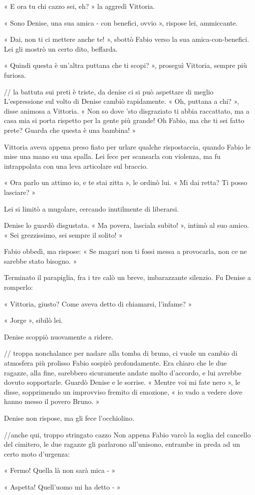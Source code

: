 « E ora tu chi cazzo sei, eh? » la aggredì Vittoria.

« Sono Denise, una sua amica - con benefici, ovvio », rispose lei, ammiccante.

« Dai, non ti ci mettere anche te! », sbottò Fabio verso la sua amica-con-benefici. Lei gli mostrò un certo dito, beffarda.

« Quindi questa è un'altra puttana che ti scopi? », proseguì Vittoria, sempre più furiosa.

// la battuta sui preti è triste, da denise ci si può aspettare di meglio
L'espressione sul volto di Denise cambiò rapidamente. « Oh, puttana a chi? », disse animosa a Vittoria. « Non so dove 'sto disgraziato ti abbia raccattato, ma a casa mia si porta rispetto per la gente più grande! Oh Fabio, ma che ti sei fatto prete? Guarda che questa è una bambina! »

Vittoria aveva appena preso fiato per urlare qualche rispostaccia, quando Fabio le mise una mano su una spalla. Lei fece per scansarla con violenza, ma fu intrappolata con una leva articolare sul braccio.

« Ora parlo un attimo io, e te stai zitta », le ordinò lui. « Mi dai retta? Ti posso lasciare? »

Lei si limitò a mugolare, cercando inutilmente di liberarsi.

Denise lo guardò disgustata. « Ma povera, lasciala subito! », intimò al suo amico. « Sei grezzissimo, sei sempre il solito! »

Fabio obbedì, ma rispose: « Se magari non ti fossi messa a provocarla, non ce ne sarebbe stato bisogno. »

Terminato il parapiglia, fra i tre calò un breve, imbarazzante silenzio. Fu Denise a romperlo:

« Vittoria, giusto? Come aveva detto di chiamarsi, l'infame? »

« Jorge », sibilò lei.

Denise scoppiò nuovamente a ridere.

// troppa nonchalance per nadare alla tomba di bruno, ci vuole un cambio di atmosfera più prolisso
Fabio sospirò profondamente. Era chiaro che le due ragazze, alla fine, sarebbero sicuramente andate molto d'accordo, e lui avrebbe dovuto sopportarle. Guardò Denise e le sorrise. « Mentre voi mi fate nero », le disse, sopprimendo un improvviso fremito di emozione, « io vado a vedere dove hanno messo il povero Bruno. »

Denise non rispose, ma gli fece l'occhiolino.

//anche qui, troppo stringato cazzo
Non appena Fabio varcò la soglia del cancello del cimitero, le due ragazze gli parlarono all'unisono, entrambe in preda ad un certo moto d'urgenza:

« Fermo! Quella là non sarà mica - »

« Aspetta! Quell'uomo mi ha detto - »

